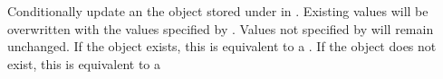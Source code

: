 Conditionally update an the object stored under  in .
Existing values will be overwritten with the values specified by .
Values not specified by  will remain unchanged.  If the object
exists, this is equivalent to a .  If the object does not exist,
this is equivalent to a 


